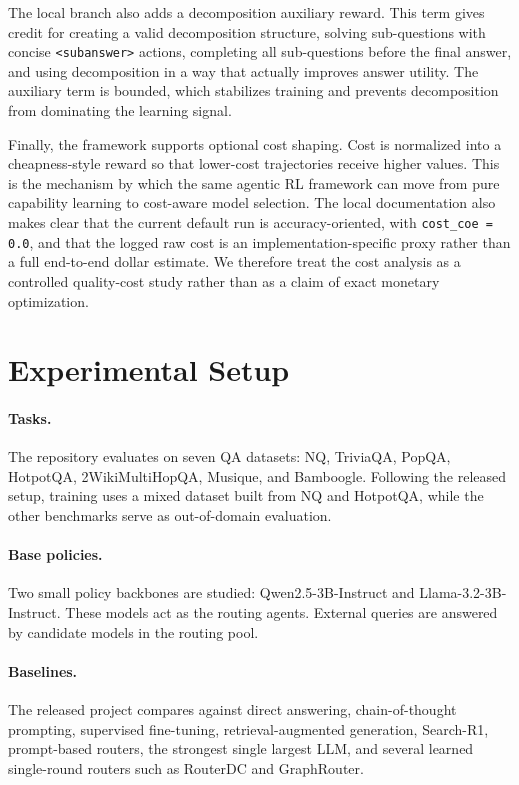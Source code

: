 \documentclass{article}
\begin{document}
The local branch also adds a decomposition auxiliary reward. This term gives credit for creating a valid decomposition structure, solving sub-questions with concise \texttt{<subanswer>} actions, completing all sub-questions before the final answer, and using decomposition in a way that actually improves answer utility. The auxiliary term is bounded, which stabilizes training and prevents decomposition from dominating the learning signal.

Finally, the framework supports optional cost shaping. Cost is normalized into a cheapness-style reward so that lower-cost trajectories receive higher values. This is the mechanism by which the same agentic RL framework can move from pure capability learning to cost-aware model selection. The local documentation also makes clear that the current default run is accuracy-oriented, with \texttt{cost\_coe = 0.0}, and that the logged raw cost is an implementation-specific proxy rather than a full end-to-end dollar estimate. We therefore treat the cost analysis as a controlled quality-cost study rather than as a claim of exact monetary optimization.

\section{Experimental Setup}
\label{sec:exp}

\paragraph{Tasks.}
The repository evaluates on seven QA datasets: NQ, TriviaQA, PopQA, HotpotQA, 2WikiMultiHopQA, Musique, and Bamboogle. Following the released setup, training uses a mixed dataset built from NQ and HotpotQA, while the other benchmarks serve as out-of-domain evaluation.

\paragraph{Base policies.}
Two small policy backbones are studied: Qwen2.5-3B-Instruct and Llama-3.2-3B-Instruct. These models act as the routing agents. External queries are answered by candidate models in the routing pool.

\paragraph{Baselines.}
The released project compares against direct answering, chain-of-thought prompting, supervised fine-tuning, retrieval-augmented generation, Search-R1, prompt-based routers, the strongest single largest LLM, and several learned single-round routers such as RouterDC and GraphRouter.
\end{document}
